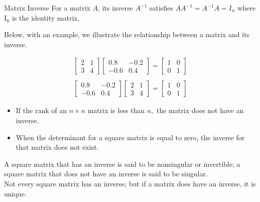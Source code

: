 \documentclass{beamer}
\begin{document}
\begin{frame}{Matrix Inverse}
For a matrix $A$, its inverse $A^{-1}$ satisfies $AA^{-1} = A^{-1}A = I_n$ where $\mathrm{I}_{\mathrm{n}}$ is the identity matrix.

\pause  Below, with an example, we illustrate the relationship between a matrix and its inverse.

\pause \[
\begin{array}{l}
{\left[\begin{array}{cc}
	{2} & {1} \\
	{3} & {4}
	\end{array}\right]\left[\begin{array}{cc}
	{0.8} & {-0.2} \\
	{-0.6} & {0.4}
	\end{array}\right]=\left[\begin{array}{ll}
	{1} & {0} \\
	{0} & {1}
	\end{array}\right]} \\ \\
{\left[\begin{array}{cc}
	{0.8} & {-0.2} \\
	{-0.6} & {0.4}
	\end{array}\right]\left[\begin{array}{ll}
	{2} & {1} \\
	{3} & {4}
	\end{array}\right]=\left[\begin{array}{ll}
	{1} & {0} \\
	{0} & {1}
	\end{array}\right]}
\end{array}
\]

\end{frame}

\begin{frame}\begin{itemize}
\item If the rank of an $n \times n$ matrix is less than $n,$ the matrix does not have an inverse.
	\item When the determinant for a square matrix is equal to zero, the inverse for that matrix does not exist.
\end{itemize}
\pause A square matrix that has an inverse is said to be nonsingular or invertible; a square matrix that does not have an inverse is said to be singular. \\
\pause Not every square matrix has an inverse; but if a matrix does have an inverse, it is unique.

\end{frame}
\end{document}
